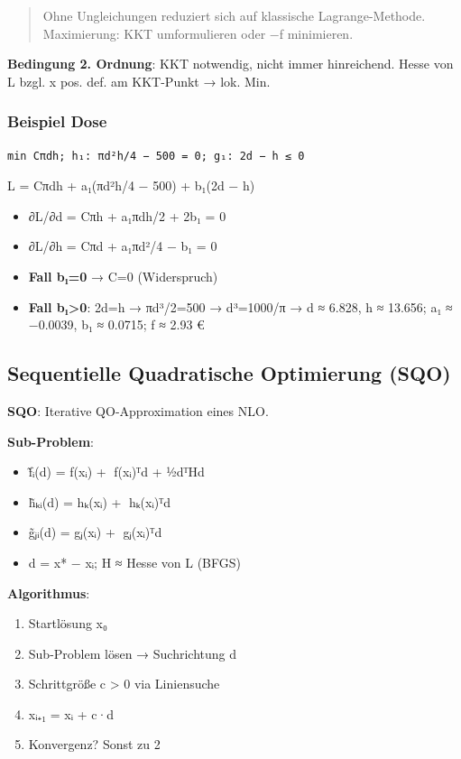\documentclass[11pt, a4paper]{article}
\begin{document}
\begin{quote}
Ohne Ungleichungen reduziert sich auf klassische Lagrange-Methode. Maximierung: KKT umformulieren oder −f minimieren.
\end{quote}

\textbf{Bedingung 2. Ordnung}: KKT notwendig, nicht immer hinreichend. Hesse von L bzgl. x⃗ pos. def. am KKT-Punkt → lok. Min.



\subsubsection{Beispiel Dose}
\begin{lstlisting}
min Cπdh; h₁: πd²h/4 − 500 = 0; g₁: 2d − h ≤ 0
\end{lstlisting}

L = Cπdh + a₁(πd²h/4 − 500) + b₁(2d − h)


\begin{itemize}
  \item ∂L/∂d = Cπh + a₁πdh/2 + 2b₁ = 0
  \item ∂L/∂h = Cπd + a₁πd²/4 − b₁ = 0
  \item \textbf{Fall b₁=0} → C=0 (Widerspruch)
  \item \textbf{Fall b₁>0}: 2d=h → πd³/2=500 → d³=1000/π → d ≈ 6.828, h ≈ 13.656; a₁ ≈ −0.0039, b₁ ≈ 0.0715; f ≈ 2.93 €
\end{itemize}


\subsection{Sequentielle Quadratische Optimierung (SQO)}

\textbf{SQO}: Iterative QO-Approximation eines NLO.


\textbf{Sub-Problem}:

\begin{itemize}
  \item f̃ᵢ(d⃗) = f(x⃗ᵢ) + ∇f(x⃗ᵢ)ᵀd⃗ + ½d⃗ᵀHd⃗
  \item h̃ₖᵢ(d⃗) = hₖ(x⃗ᵢ) + ∇hₖ(x⃗ᵢ)ᵀd⃗
  \item g̃ⱼᵢ(d⃗) = gⱼ(x⃗ᵢ) + ∇gⱼ(x⃗ᵢ)ᵀd⃗
  \item d⃗ = x⃗* − x⃗ᵢ; H ≈ Hesse von L (BFGS)
\end{itemize}

\textbf{Algorithmus}:

\begin{enumerate}
  \item Startlösung x⃗₀
  \item Sub-Problem lösen → Suchrichtung d⃗
  \item Schrittgröße c > 0 via Liniensuche
  \item x⃗ᵢ₊₁ = x⃗ᵢ + c·d⃗
  \item Konvergenz? Sonst zu 2
\end{enumerate}
\end{document}
